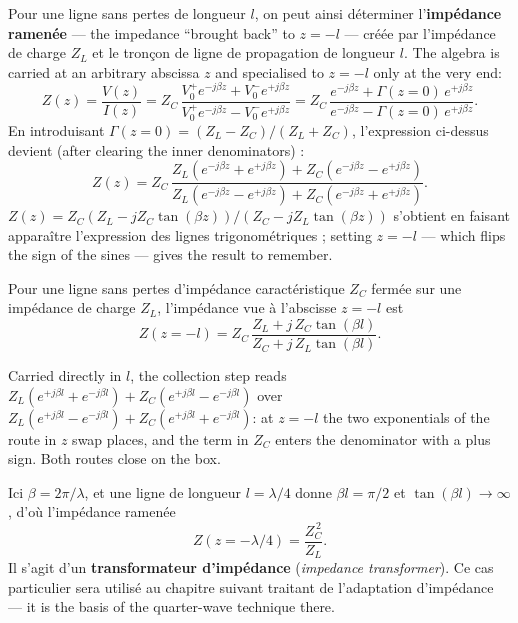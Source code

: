Pour une ligne sans pertes de longueur $l$, on peut ainsi déterminer
l'\textbf{impédance ramenée} --- the impedance ``brought back'' to $z=-l$ ---
créée par l'impédance de charge $Z_L$ et le tronçon de ligne de propagation de
longueur $l$. The algebra is carried at an arbitrary abscissa $z$ and
specialised to $z=-l$ only at the very end:
\[
  Z(z) = \frac{V(z)}{I(z)}
       = Z_C\,\frac{V_0^{+}e^{-j\beta z} + V_0^{-}e^{+j\beta z}}
                   {V_0^{+}e^{-j\beta z} - V_0^{-}e^{+j\beta z}}
       = Z_C\,\frac{e^{-j\beta z} + \Gamma(z=0)\,e^{+j\beta z}}
                   {e^{-j\beta z} - \Gamma(z=0)\,e^{+j\beta z}} .
\]
En introduisant $\Gamma(z=0) = (Z_L-Z_C)/(Z_L+Z_C)$, l'expression ci-dessus
devient (after clearing the inner denominators) :
\[
  Z(z) = Z_C\,
  \frac{Z_L\left(e^{-j\beta z} + e^{+j\beta z}\right)
        + Z_C\left(e^{-j\beta z} - e^{+j\beta z}\right)}
       {Z_L\left(e^{-j\beta z} - e^{+j\beta z}\right)
        + Z_C\left(e^{-j\beta z} + e^{+j\beta z}\right)} .
\]
$Z(z) = Z_C\left(Z_L - jZ_C\tan(\beta z)\right)/\left(Z_C - jZ_L\tan(\beta z)\right)$
s'obtient en faisant apparaître l'expression des lignes trigonométriques ;
setting $z = -l$ --- which flips the sign of the sines --- gives the result to
remember.

\begin{theorem}
  Pour une ligne sans pertes d'impédance caractéristique $Z_C$ fermée sur une
  impédance de charge $Z_L$, l'impédance vue à l'abscisse $z = -l$ est
  \[
    \boxed{\;
    Z(z=-l) = Z_C\,
    \frac{Z_L + j\,Z_C\tan(\beta l)}{Z_C + j\,Z_L\tan(\beta l)} .
    \;}
  \]
\end{theorem}

\begin{remark}
  Carried directly in $l$, the collection step reads
  $Z_L(e^{+j\beta l} + e^{-j\beta l}) + Z_C(e^{+j\beta l} - e^{-j\beta l})$
  over $Z_L(e^{+j\beta l} - e^{-j\beta l}) + Z_C(e^{+j\beta l} + e^{-j\beta l})$:
  at $z = -l$ the two exponentials of the route in $z$ swap places, and the
  term in $Z_C$ enters the denominator with a plus sign. Both routes close on
  the box.
\end{remark}

\begin{corollary}
  Ici $\beta = 2\pi/\lambda$, et une ligne de longueur $l = \lambda/4$ donne
  $\beta l = \pi/2$ et $\tan(\beta l) \to \infty$, d'où l'impédance ramenée
  \[
    \boxed{\; Z(z=-\lambda/4) = \frac{Z_C^{\,2}}{Z_L} . \;}
  \]
  Il s'agit d'un \textbf{transformateur d'impédance} (\textit{impedance
  transformer}). Ce cas particulier sera utilisé au chapitre suivant traitant
  de l'adaptation d'impédance --- it is the basis of the quarter-wave technique
  there.
\end{corollary}

